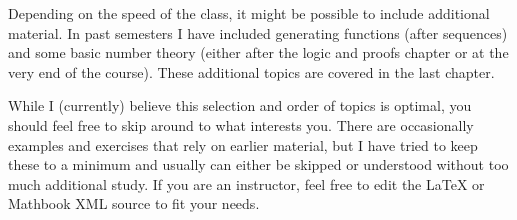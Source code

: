 \documentclass[10pt,]{book}
\theoremstyle{plain}
\theoremstyle{definition}
\theoremstyle{definition}
\theoremstyle{definition}
\theoremstyle{definition}
\numberwithin{equation}{chapter}
\begin{document}
\par
\hypertarget{p-10}{}%
Depending on the speed of the class, it might be possible to include additional material. In past semesters I have included generating functions (after sequences) and some basic number theory (either after the logic and proofs chapter or at the very end of the course). These additional topics are covered in the last chapter.%
\par
\hypertarget{p-11}{}%
While I (currently) believe this selection and order of topics is optimal, you should feel free to skip around to what interests you. There are occasionally examples and exercises that rely on earlier material, but I have tried to keep these to a minimum and usually can either be skipped or understood without too much additional study. If you are an instructor, feel free to edit the \LaTeX{} or Mathbook XML source to fit your needs.%
\typeout{************************************************}
\typeout{************************************************}
\end{document}
